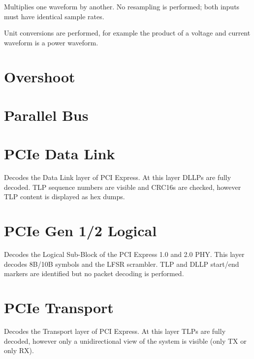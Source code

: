 Multiplies one waveform by another. No resampling is performed; both inputs must have identical sample rates.

Unit conversions are performed, for example the product of a voltage and current waveform is a power waveform.

\pagebreak
\section{Overshoot}

\pagebreak
\section{Parallel Bus}

\pagebreak
\section{PCIe Data Link}

Decodes the Data Link layer of PCI Express. At this layer DLLPs are fully decoded. TLP sequence numbers are visible
and CRC16s are checked, however TLP content is displayed as hex dumps.

\pagebreak
\section{PCIe Gen 1/2 Logical}

Decodes the Logical Sub-Block of the PCI Express 1.0 and 2.0 PHY. This layer decodes 8B/10B symbols and the LFSR
scrambler. TLP and DLLP start/end markers are identified but no packet decoding is performed.

\pagebreak
\section{PCIe Transport}

Decodes the Transport layer of PCI Express. At this layer TLPs are fully decoded, however only a unidirectional view
of the system is visible (only TX or only RX).

